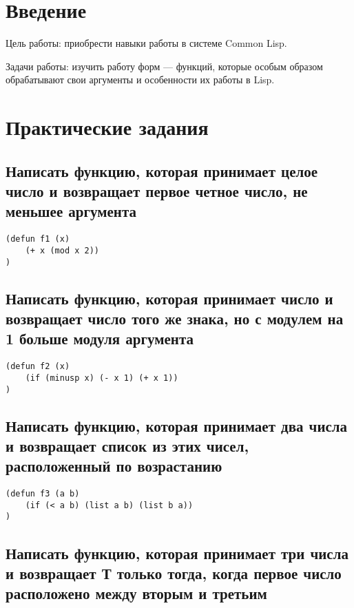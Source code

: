 \documentclass[a4paper, 14pt, unknownkeysallowed]{extreport}
\begin{document}

\setcounter{page}{2}

\chapter*{Введение}
Цель работы: приобрести навыки работы в системе Common Lisp.

Задачи работы: изучить работу форм — функций, которые особым образом обрабатывают свои аргументы и особенности их работы в Lisp.

\chapter{Практические задания}

\section{Написать функцию, которая принимает целое число и возвращает первое четное число, не меньшее аргумента}
\begin{lstlisting}
(defun f1 (x)
	(+ x (mod x 2))
)
\end{lstlisting}

\section{Написать функцию, которая принимает число и возвращает число того же знака, но с модулем на 1 больше модуля аргумента}

\begin{lstlisting}
(defun f2 (x)
	(if (minusp x) (- x 1) (+ x 1))
)
\end{lstlisting}

\section{Написать функцию, которая принимает два числа и возвращает список из этих чисел, расположенный по возрастанию}

\begin{lstlisting}
(defun f3 (a b)
	(if (< a b) (list a b) (list b a))
)
\end{lstlisting}

\section{Написать функцию, которая принимает три числа и возвращает Т только тогда, когда первое число расположено между вторым и третьим}
\end{document}
